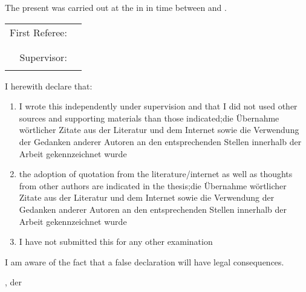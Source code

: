 \thispagestyle{plain}
The present \worktype{} was carried out at the \institute{} in \workplace in time between \workstart{} and \workstop{}.

\begin{center}
	\begin{tabular}{rl}
		First Referee: &\headrg\\
		&\department\\
		&\institute\\
		Supervisor: &\supervisor\\
		&\\ %
	\end{tabular}
\end{center}










I herewith declare that:
\begin{enumerate}
	\item I wrote this \worktype independently under supervision and that I did not used other sources and supporting materials than those indicated;die Übernahme wörtlicher Zitate aus der Literatur und dem Internet sowie die Verwendung der Gedanken anderer Autoren an den entsprechenden Stellen innerhalb der Arbeit gekennzeichnet wurde
	\item the adoption of quotation from the literature/internet as well as thoughts from other authors are indicated in the thesis;die Übernahme wörtlicher Zitate aus der Literatur und dem Internet sowie die Verwendung der Gedanken anderer Autoren an den entsprechenden Stellen innerhalb der Arbeit gekennzeichnet wurde
	\item I have not submitted this \worktype for any other examination
\end{enumerate}

I am aware of the fact that a false declaration will have legal consequences.

\workplace{}, der \submissiondate{}
\vspace{1,5cm}
\begin{center}
	\begin{minipage}[t]{8cm}
		\centering \dotfill \\
		\workauthor{}
	\end{minipage}
\end{center}


